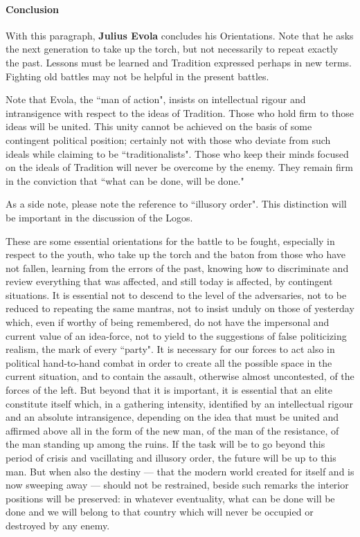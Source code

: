 \paragraph{Conclusion}
\begin{quotex}
With this paragraph, \textbf{Julius Evola} concludes his Orientations. Note that he asks the next generation to take up the torch, but not necessarily to repeat exactly the past. Lessons must be learned and Tradition expressed perhaps in new terms. Fighting old battles may not be helpful in the present battles.

Note that Evola, the ``man of action", insists on intellectual rigour and intransigence with respect to the ideas of Tradition. Those who hold firm to those ideas will be united. This unity cannot be achieved on the basis of some contingent political position; certainly not with those who deviate from such ideals while claiming to be ``traditionalists". Those who keep their minds focused on the ideals of Tradition will never be overcome by the enemy. They remain firm in the conviction that ``what can be done, will be done."

As a side note, please note the reference to ``illusory order". This distinction will be important in the discussion of the Logos. 

\end{quotex}
These are some essential orientations for the battle to be fought, especially in respect to the youth, who take up the torch and the baton from those who have not fallen, learning from the errors of the past, knowing how to discriminate and review everything that was affected, and still today is affected, by contingent situations. It is essential not to descend to the level of the adversaries, not to be reduced to repeating the same mantras, not to insist unduly on those of yesterday which, even if worthy of being remembered, do not have the impersonal and current value of an idea-force, not to yield to the suggestions of false politicizing realism, the mark of every ``party". It is necessary for our forces to act also in political hand-to-hand combat in order to create all the possible space in the current situation, and to contain the assault, otherwise almost uncontested, of the forces of the left. But beyond that it is important, it is essential that an elite constitute itself which, in a gathering intensity, identified by an intellectual rigour and an absolute intransigence, depending on the idea that must be united and affirmed above all in the form of the new man, of the man of the resistance, of the man standing up among the ruins. If the task will be to go beyond this period of crisis and vacillating and illusory order, the future will be up to this man. But when also the destiny — that the modern world created for itself and is now sweeping away — should not be restrained, beside such remarks the interior positions will be preserved: in whatever eventuality, what can be done will be done and we will belong to that country which will never be occupied or destroyed by any enemy.


